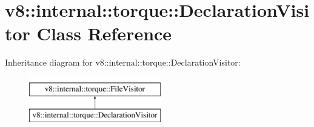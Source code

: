 \hypertarget{classv8_1_1internal_1_1torque_1_1DeclarationVisitor}{}\section{v8\+:\+:internal\+:\+:torque\+:\+:Declaration\+Visitor Class Reference}
\label{classv8_1_1internal_1_1torque_1_1DeclarationVisitor}
Inheritance diagram for v8\+:\+:internal\+:\+:torque\+:\+:Declaration\+Visitor\+:\begin{figure}[H]
\begin{center}
\leavevmode
\includegraphics[height=2.000000cm]{classv8_1_1internal_1_1torque_1_1DeclarationVisitor}
\end{center}
\end{figure}
